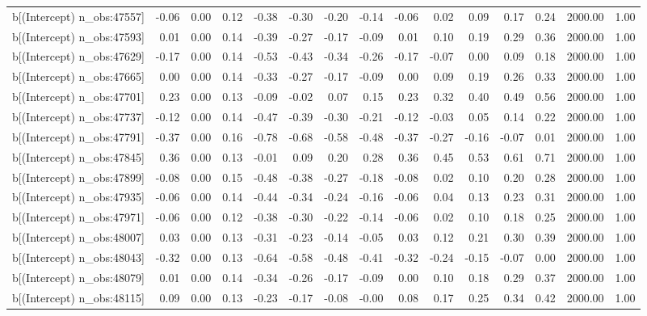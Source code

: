 \begin{table}[ht]
\begin{tabular}{rrrrrrrrrrrrrrr}
  b[(Intercept) n\_obs:47557] & -0.06 & 0.00 & 0.12 & -0.38 & -0.30 & -0.20 & -0.14 & -0.06 & 0.02 & 0.09 & 0.17 & 0.24 & 2000.00 & 1.00 \\ 
  b[(Intercept) n\_obs:47593] & 0.01 & 0.00 & 0.14 & -0.39 & -0.27 & -0.17 & -0.09 & 0.01 & 0.10 & 0.19 & 0.29 & 0.36 & 2000.00 & 1.00 \\ 
  b[(Intercept) n\_obs:47629] & -0.17 & 0.00 & 0.14 & -0.53 & -0.43 & -0.34 & -0.26 & -0.17 & -0.07 & 0.00 & 0.09 & 0.18 & 2000.00 & 1.00 \\ 
  b[(Intercept) n\_obs:47665] & 0.00 & 0.00 & 0.14 & -0.33 & -0.27 & -0.17 & -0.09 & 0.00 & 0.09 & 0.19 & 0.26 & 0.33 & 2000.00 & 1.00 \\ 
  b[(Intercept) n\_obs:47701] & 0.23 & 0.00 & 0.13 & -0.09 & -0.02 & 0.07 & 0.15 & 0.23 & 0.32 & 0.40 & 0.49 & 0.56 & 2000.00 & 1.00 \\ 
  b[(Intercept) n\_obs:47737] & -0.12 & 0.00 & 0.14 & -0.47 & -0.39 & -0.30 & -0.21 & -0.12 & -0.03 & 0.05 & 0.14 & 0.22 & 2000.00 & 1.00 \\ 
  b[(Intercept) n\_obs:47791] & -0.37 & 0.00 & 0.16 & -0.78 & -0.68 & -0.58 & -0.48 & -0.37 & -0.27 & -0.16 & -0.07 & 0.01 & 2000.00 & 1.00 \\ 
  b[(Intercept) n\_obs:47845] & 0.36 & 0.00 & 0.13 & -0.01 & 0.09 & 0.20 & 0.28 & 0.36 & 0.45 & 0.53 & 0.61 & 0.71 & 2000.00 & 1.00 \\ 
  b[(Intercept) n\_obs:47899] & -0.08 & 0.00 & 0.15 & -0.48 & -0.38 & -0.27 & -0.18 & -0.08 & 0.02 & 0.10 & 0.20 & 0.28 & 2000.00 & 1.00 \\ 
  b[(Intercept) n\_obs:47935] & -0.06 & 0.00 & 0.14 & -0.44 & -0.34 & -0.24 & -0.16 & -0.06 & 0.04 & 0.13 & 0.23 & 0.31 & 2000.00 & 1.00 \\ 
  b[(Intercept) n\_obs:47971] & -0.06 & 0.00 & 0.12 & -0.38 & -0.30 & -0.22 & -0.14 & -0.06 & 0.02 & 0.10 & 0.18 & 0.25 & 2000.00 & 1.00 \\ 
  b[(Intercept) n\_obs:48007] & 0.03 & 0.00 & 0.13 & -0.31 & -0.23 & -0.14 & -0.05 & 0.03 & 0.12 & 0.21 & 0.30 & 0.39 & 2000.00 & 1.00 \\ 
  b[(Intercept) n\_obs:48043] & -0.32 & 0.00 & 0.13 & -0.64 & -0.58 & -0.48 & -0.41 & -0.32 & -0.24 & -0.15 & -0.07 & 0.00 & 2000.00 & 1.00 \\ 
  b[(Intercept) n\_obs:48079] & 0.01 & 0.00 & 0.14 & -0.34 & -0.26 & -0.17 & -0.09 & 0.00 & 0.10 & 0.18 & 0.29 & 0.37 & 2000.00 & 1.00 \\ 
  b[(Intercept) n\_obs:48115] & 0.09 & 0.00 & 0.13 & -0.23 & -0.17 & -0.08 & -0.00 & 0.08 & 0.17 & 0.25 & 0.34 & 0.42 & 2000.00 & 1.00 \\ 

\end{tabular}
\end{table}
